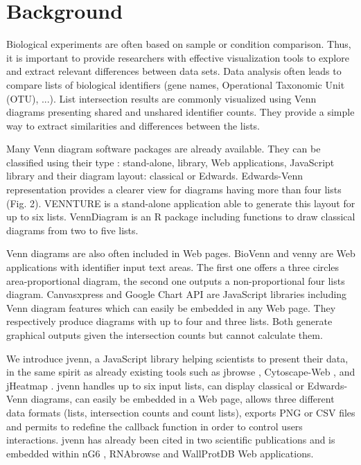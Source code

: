 \documentclass{bmcart}
\begin{document}


\section*{Background}

Biological experiments are often based on sample or condition comparison.
Thus, it is important to provide researchers with effective visualization 
tools to explore and extract relevant differences between data sets. Data
analysis often leads to compare lists of biological identifiers (gene names, 
Operational Taxonomic Unit (OTU), ...). List intersection results are commonly 
visualized using Venn diagrams \cite{Venn1880} presenting shared and unshared 
identifier counts. They provide a simple way to extract similarities and
differences between the lists.

Many Venn diagram software packages are already available. They can be classified 
using their type : stand-alone, library, Web applications, JavaScript library and 
their diagram layout: classical or Edwards. Edwards-Venn \cite{Edwards2004} representation provides
a clearer view for diagrams having more than four lists (Fig. 2). VENNTURE \cite{Bronwen2012}
is a stand-alone application able to generate this layout for up to six lists. VennDiagram \cite{RVennDiagram}
is an R package including functions to draw classical diagrams from two to five lists. 

Venn diagrams are also often included in Web pages.  BioVenn \cite{Hulsen2008} and venny
\cite{venny} are Web applications with identifier input text areas. The
first one offers a three circles area-proportional diagram, the second one 
outputs a non-proportional four lists diagram. Canvasxpress
\cite{canvasxpress} and Google Chart API \cite{googleAPI} are
JavaScript libraries including Venn diagram features which can easily be
embedded in any Web page. They respectively produce diagrams with up to four and three lists.
Both generate graphical outputs given the intersection counts but cannot calculate them. 

We introduce jvenn, a JavaScript library helping scientists to present their
data, in the same spirit as already existing tools such as jbrowse
\cite{Westesson01032013}, Cytoscape-Web \cite{Lopes2010}, and jHeatmap
\cite{DeuPons2014}. jvenn handles up to six input lists, can display classical
or Edwards-Venn diagrams, can easily be embedded in a Web
page, allows three different data formats (lists, intersection counts and count
lists), exports PNG or CSV files and permits to redefine the callback function
in order to control users interactions. jvenn has already been cited in two
scientific publications \cite{Bianchia2013, Aravindraja2013} and is embedded
within nG6 \cite{Mariette2012}, RNAbrowse \cite{Mariette} and WallProtDB
\cite{SanClemente} Web applications.
\end{document}
